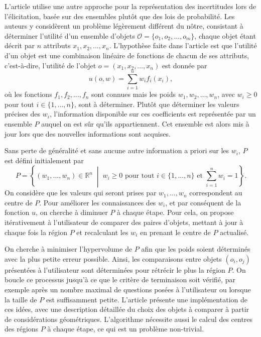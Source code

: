 \documentclass[a4paper,11pt]{article}
\theoremstyle{plain}
\theoremstyle{definition}
\begin{document}
L'article \cite{iyengar_q-eval_2001} utilise une autre approche pour la représentation des incertitudes lors de l'élicitation, basée sur des ensembles plutôt que des lois de probabilité. Les auteurs y considèrent un problème légèrement différent du nôtre, consistant à déterminer l'utilité d'un ensemble d'objets $\mathcal O = \{o_1, o_2, \dotsc, o_m\}$, chaque objet étant décrit par $n$ attributs $x_1, x_2, \dotsc, x_n$. L'hypothèse faite dans l'article est que l'utilité d'un objet est une combinaison linéaire de fonctions de chacun de ses attributs, c'est-à-dire, l'utilité de l'objet $o = (x_1, x_2, \dotsc, x_n)$ est donnée par
\[u(o, w) = \sum_{i = 1}^{n} w_i f_i(x_i),\]
où les fonctions $f_1, f_2, \dotsc, f_n$ sont connues mais les poids $w_1, w_2, \dotsc, w_n$, avec $w_i \geq 0$ pour tout $i \in \{1, \dotsc, n\}$, sont à déterminer. Plutôt que déterminer les valeurs précises des $w_i$, l'information disponible sur ces coefficients est représentée par un ensemble $P$ auquel on est sûr qu'ils appartiennent. Cet ensemble est alors mis à jour lors que des nouvelles informations sont acquises.

Sans perte de généralité et sans aucune autre information a priori sur les $w_i$, $P$ est défini initialement par
\[P = \left\{(w_1, \dotsc, w_n) \in \mathbb R^n \;\middle\vert\; w_i \geq 0 \text{ pour tout } i \in \{1, \dotsc, n\} \text{ et } \sum_{i=1}^n w_i = 1\right\}.\]
%
On considère que les valeurs qui seront prises par $w_1, \dotsc, w_n$ correspondent au centre de $P$. Pour améliorer les connaissances des $w_i$, et par conséquent de la fonction $u$, on cherche à diminuer $P$ à chaque étape. Pour cela, on propose itérativement à l'utilisateur de comparer des paires d'objets, mettant à jour à chaque fois la région $P$ et recalculant les $w_i$ en prenant le centre de $P$ actualisé.

On cherche à minimiser l'hypervolume de $P$ afin que les poids soient déterminés avec la plus petite erreur possible. Ainsi, les comparaisons entre objets $(o_i, o_j)$ présentées à l'utilisateur sont déterminées pour rétrécir le plus la région $P$. On boucle ce processus jusqu'à ce que le critère de terminaison soit vérifié, par exemple après un nombre maximal de questions posées à l'utilisateur ou lorsque la taille de $P$ est suffisamment petite. L'article \cite{iyengar_q-eval_2001} présente une implémentation de ces idées, avec une description détaillée du choix des objets à comparer à partir de considérations géométriques. L'algorithme nécessite aussi le calcul des centres des régions $P$ à chaque étape, ce qui est un problème non-trivial.
\end{document}
